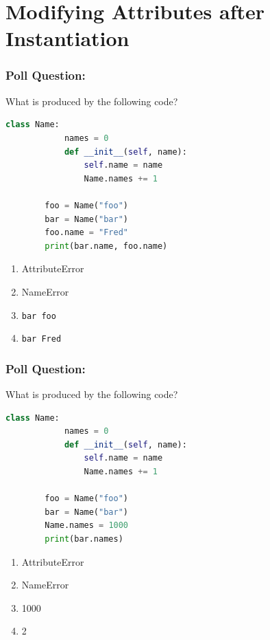 \documentclass{beamer}
\begin{document}
\section{Modifying Attributes after Instantiation}
%
%
%
\begin{frame}[fragile]
	\frametitle{Poll Question: }
	\begin{minipage}{0.69\textwidth}
		What is produced by the following code?
		\begin{lstlisting}[language=Python, autogobble, basicstyle=\tiny]
		class Name:
			names = 0
			def __init__(self, name):
				self.name = name
				Name.names += 1

		foo = Name("foo")
		bar = Name("bar")
		foo.name = "Fred"
		print(bar.name, foo.name)
		\end{lstlisting}
	\end{minipage}
	\hfill
	\begin{minipage}{0.29\textwidth}
		\begin{enumerate}[A]
			\item AttributeError
			\item NameError
			\item \lstinline|bar foo|
			\item \lstinline|bar Fred|
		\end{enumerate}
	\end{minipage}
\end{frame}

%
%
%
\begin{frame}[fragile]
	\frametitle{Poll Question: }
	\begin{minipage}{0.69\textwidth}
		What is produced by the following code?
		\begin{lstlisting}[language=Python, autogobble, basicstyle=\tiny]
		class Name:
			names = 0
			def __init__(self, name):
				self.name = name
				Name.names += 1

		foo = Name("foo")
		bar = Name("bar")
		Name.names = 1000
		print(bar.names)
		\end{lstlisting}
	\end{minipage}
	\hfill
	\begin{minipage}{0.29\textwidth}
		\begin{enumerate}[A]
			\item AttributeError
			\item NameError
			\item 1000
			\item 2
		\end{enumerate}
	\end{minipage}
\end{frame}
\end{document}
